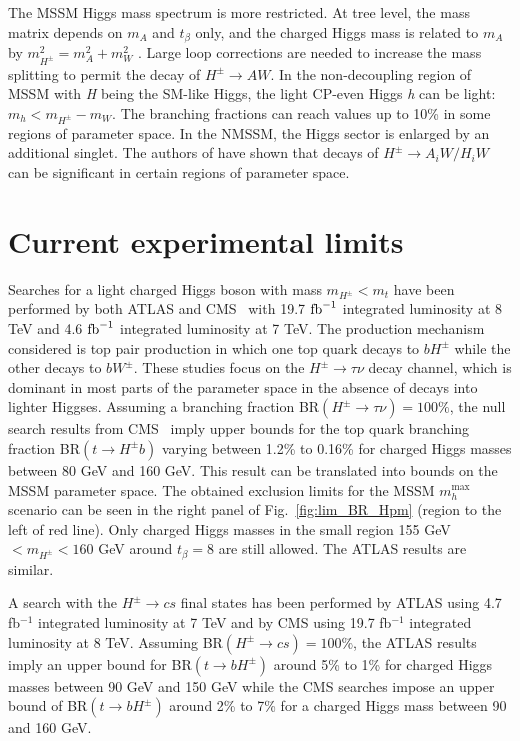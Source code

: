The MSSM Higgs mass spectrum is more restricted. At tree level, the mass matrix depends on $m_A$ and $t_{\beta}$ only, and the charged Higgs mass is related to $m_A$ by $m_{H^{\pm}}^2 =m_A^2 + m_W^2$ . Large loop corrections are needed to increase the mass splitting to permit the decay of $H^{\pm} \rightarrow A W$. In the non-decoupling region of MSSM with \emph{H} being the SM-like Higgs, the light CP-even Higgs \emph{h} can be light: $m_{h}<m_{H^{\pm}}-m_W$. The branching fractions can reach values up to 10\% \cite{Heinemeyer:2013tqa} in some regions of parameter space. In the NMSSM, the Higgs sector is enlarged by an additional singlet. The authors of \cite{Christensen:2013dra,Drees:1999sb} have shown that decays of $H^{\pm} \rightarrow A_iW/H_iW$ can be significant in certain regions of parameter space. 
 
\section{Current experimental limits}
\label{sec:limits}

Searches for a light charged Higgs boson with mass $m_{H^{\pm}}<m_t$ have been performed by both ATLAS and CMS~\cite{TheATLAScollaboration:2013wia,CMS:2014cdp} with 19.7 $ \text{fb}^{-1} $ integrated luminosity at 8 TeV and 4.6 $ \text{fb}^{-1} $ integrated luminosity at 7 TeV. The production mechanism considered is top pair production in which one top quark decays to $bH^{\pm} $ while the other decays to $bW^\pm$. These studies focus on the $H^{\pm} \rightarrow \tau \nu$ decay channel, which is dominant in most parts of the parameter space in the absence of decays into lighter Higgses. Assuming a branching fraction BR$(H^{\pm} \rightarrow \tau \nu) = 100 \%$, the null search results from CMS~\cite{CMS:2014cdp} imply upper bounds for the top quark branching fraction BR$(t \rightarrow H^{\pm} b)$ varying between 1.2\% to 0.16\% for charged Higgs masses between 80 GeV and 160 GeV. This result can be translated into bounds on the MSSM parameter space. The obtained exclusion limits for the MSSM $m_h^\text{max}$ scenario can be seen in the right panel of Fig.~\ref{fig:lim_BR_Hpm} (region to the left of red line). Only charged Higgs masses in the small region 155 GeV $< m_{H^{\pm}} < 160 $ GeV around $t_{\beta} = 8$ are still allowed. The ATLAS results \cite{TheATLAScollaboration:2013wia} are similar.
 
A search with the $H^{\pm} \rightarrow cs$ final states has been performed by ATLAS \cite{Aad:2013hla} using 4.7 fb$^{-1}$ integrated luminosity at 7 TeV and by CMS \cite{CMS:2014kga} using 19.7 fb$^{-1}$ integrated luminosity at 8 TeV. Assuming BR$(H^{\pm} \rightarrow c s) = 100 \%$, the ATLAS results imply an upper bound for BR$(t \rightarrow b H^{\pm} )$ around 5\% to 1\% for charged Higgs masses between 90 GeV and 150 GeV while the CMS searches impose an upper bound of BR$(t \rightarrow b H^{\pm} ) $ around 2\% to 7\% for a charged Higgs mass between 90 and 160 GeV.

